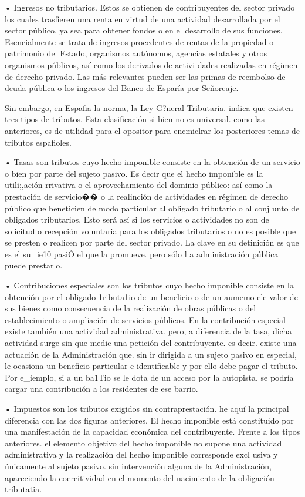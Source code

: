 \documentclass[10pt,a4paper]{article}
\begin{document}
{• Ingresos no tributarios. Estos se obtienen de contribuyentes del sector privado los cuales trasfieren una renta en virtud de una actividad desarrollada por el sector público, ya sea para obtener fondos o en el desarrollo de sus funciones. Esencialmente se trata de ingresos procedentes de rentas de la propiedad o patrimonio del Estado, organismos autónomos, agencias estatales y otros organismos públicos, así como los derivados de activi dades realizadas en régimen de derecho privado. Las más relevantes pueden ser las primas de reembolso de deuda pública o los ingresos del Banco de Esparía por Señoreaje.

Sin embargo, en Espafia la norma, la Ley G?neral Tributaria. indica que existen tres tipos de tributos. Esta clasificación si bien no es universal. como las anteriores, es de utilidad para el opositor para encmiclrar los posteriores temas de tributos espafioles.

• Tasas son tributos cuyo hecho imponible consiste en la obtención de un servicio o bien por parte del sujeto pasivo. Es decir que el hecho imponible es la utili;,ación rrivativa o el aprovechamiento del dominio público: así como la prestación de servicio�� o la realinción de actividades en régimen de derecho público que beneticien de modo particular al obligado tributario o al conj unto de obligados tributarios. Esto será así si los servicios o actividades no son de solicitud o recepción voluntaria para los obligados tributarios o no es posible que se presten o realicen por parte del sector privado. La clave en su detinición es que es el su_ie10 pasi\'O el que la promueve. pero sólo l a administración pública puede prestarlo.

• Contribuciones especiales son los tributos cuyo hecho imponible consiste en la obtención por el obligado 1ributa1io de un benelicio o de un aumemo ele valor de sus bienes como consecuencia de la realización de obras públicas o del establecimiento o ampliación de servicios públicos. En la contribución especial existe también una actividad administrativa. pero, a diferencia de la tasa, dicha actividad surge sin que medie una petición del  contribuyente. es decir. existe una actuación de la Administración que. sin ir dirigida a un sujeto pasivo en especial, le ocasiona un beneficio particular e identificable y por ello debe pagar el tributo. Por e_iemplo, si a un ba1Tio se le dota de un acceso por la autopista, se podría cargar una contribución a los residentes de ese barrio.

• Impuestos son los tributos exigidos sin contraprestación. he aquí la principal diferencia con las dos figuras anteriores. El hecho imponible está constituido por una manifestación de la capacidad económica del contribuyente. Frente a los tipos anteriores. el elemento objetivo del hecho imponible no supone una actividad administrativa y la realización del hecho imponible corresponde excl usiva y únicamente al sujeto pasivo. sin intervención alguna de la Administración, apareciendo la coercitividad en el momento del nacimiento de la obligación tributatia.





}
\end{document}
